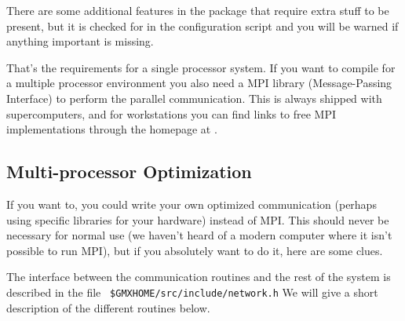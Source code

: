 There are some additional features in the package that require extra
stuff to be present, but it is checked for in the configuration script
and you will be warned if anything important is missing.

That's the requirements for a single processor system. If you want
to compile {\gromacs} for a multiple processor environment you also
need a MPI library (Message-Passing Interface) to perform the 
parallel communication. This is always shipped with supercomputers, and
for workstations you can find links to free MPI implementations through
the {\gromacs} homepage at {\wwwpage}.

\subsection{Multi-processor Optimization}

If you want to, you could write your own optimized communication
(perhaps using specific libraries for your hardware) instead
of MPI. This should never be necessary for normal use
(we haven't heard of a modern computer where it isn't possible
to run MPI), but if you absolutely want to do it, here are some clues.

The interface between the communication routines and the
rest of the {\gromacs} system is described in the file {\tt
\$GMXHOME/src/include/network.h} We will give a short description of the
different routines below.

